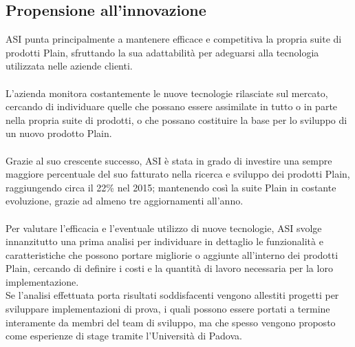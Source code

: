 \subsection{Propensione all'innovazione}
ASI punta principalmente a mantenere efficace e competitiva la propria suite di prodotti Plain, sfruttando la sua adattabilità per adeguarsi alla tecnologia utilizzata nelle aziende clienti.
\\\\
L'azienda monitora costantemente le nuove tecnologie rilasciate sul mercato, cercando di individuare quelle che possano essere assimilate in tutto o in parte nella propria suite di prodotti, o che possano costituire la base per lo sviluppo di un nuovo prodotto Plain.
\\\\
Grazie al suo crescente successo, ASI è stata in grado di investire una sempre maggiore percentuale del suo fatturato nella ricerca e sviluppo dei prodotti Plain, raggiungendo circa il 22\% nel 2015; mantenendo così la suite Plain in costante evoluzione, grazie ad almeno tre aggiornamenti all'anno.
\\\\
Per valutare l'efficacia e l'eventuale utilizzo di nuove tecnologie, ASI svolge innanzitutto una prima analisi per individuare in dettaglio le funzionalità e caratteristiche che possono portare migliorie o aggiunte all'interno dei prodotti Plain, cercando di definire i costi e la quantità di lavoro necessaria per la loro implementazione.
\\
Se l'analisi effettuata porta risultati soddisfacenti vengono allestiti progetti per sviluppare implementazioni di prova, i quali possono essere portati a termine interamente da membri del team di sviluppo, ma che spesso vengono proposto come esperienze di stage tramite l'Università di Padova.

